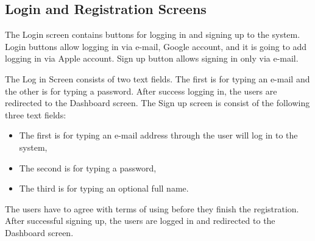 \subsection{Login and Registration Screens}\label{subsec:login-screen}
The Login screen contains buttons for logging in and signing up to the system.
Login buttons allow logging in via e-mail, Google account, and it is going to add logging in via Apple account.
Sign up button allows signing in only via e-mail.

The Log in Screen consists of two text fields.
The first is for typing an e-mail and the other is for typing a password.
After success logging in, the users are redirected to the Dashboard screen.
\newpage
The Sign up screen is consist of the following three text fields:
\begin{itemize}
    \item The first is for typing an e-mail address through the user will log in to the system,
    \item The second is for typing a password,
    \item The third is for typing an optional full name.
\end{itemize}

The users have to agree with terms of using before they finish the registration.
After successful signing up, the users are logged in and redirected to the Dashboard screen.
